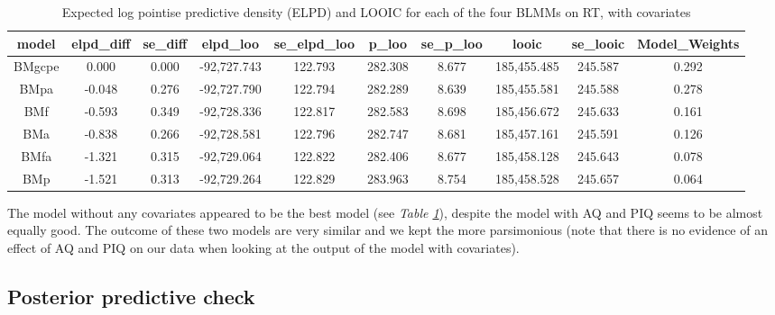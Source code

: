 \documentclass[
  11pt,
  english,
  ,doc,floatsintext]{apa6}
\begin{document}
\begin{table}[htb]

\begin{center}
\begin{threeparttable}

\caption{\label{tab:modelComp2RT}Expected log pointise predictive density (ELPD) and LOOIC for each of the four BLMMs on RT, with covariates}

\tiny{

\begin{tabular}{cccccccccc}
\toprule
model & \multicolumn{1}{c}{elpd\_diff} & \multicolumn{1}{c}{se\_diff} & \multicolumn{1}{c}{elpd\_loo} & \multicolumn{1}{c}{se\_elpd\_loo} & \multicolumn{1}{c}{p\_loo} & \multicolumn{1}{c}{se\_p\_loo} & \multicolumn{1}{c}{looic} & \multicolumn{1}{c}{se\_looic} & \multicolumn{1}{c}{Model\_Weights}\\
\midrule
BMgcpe & 0.000 & 0.000 & -92,727.743 & 122.793 & 282.308 & 8.677 & 185,455.485 & 245.587 & 0.292\\
BMpa & -0.048 & 0.276 & -92,727.790 & 122.794 & 282.289 & 8.639 & 185,455.581 & 245.588 & 0.278\\
BMf & -0.593 & 0.349 & -92,728.336 & 122.817 & 282.583 & 8.698 & 185,456.672 & 245.633 & 0.161\\
BMa & -0.838 & 0.266 & -92,728.581 & 122.796 & 282.747 & 8.681 & 185,457.161 & 245.591 & 0.126\\
BMfa & -1.321 & 0.315 & -92,729.064 & 122.822 & 282.406 & 8.677 & 185,458.128 & 245.643 & 0.078\\
BMp & -1.521 & 0.313 & -92,729.264 & 122.829 & 283.963 & 8.754 & 185,458.528 & 245.657 & 0.064\\
\bottomrule
\end{tabular}

}

\end{threeparttable}
\end{center}

\end{table}

The model without any covariates appeared to be the best model (see \emph{Table \ref{tab:modelComp2RT}}), despite the model with AQ and PIQ seems to be almost equally good. The outcome of these two models are very similar and we kept the more parsimonious (note that there is no evidence of an effect of AQ and PIQ on our data when looking at the output of the model with covariates).

\hypertarget{posterior-predictive-check}{%
\subsection{Posterior predictive check}\label{posterior-predictive-check}}
\end{document}
